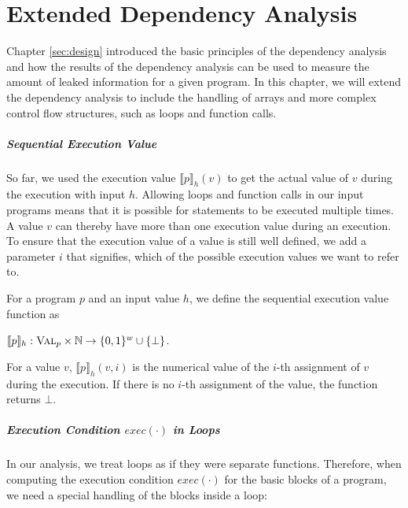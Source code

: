 \chapter{Extended Dependency Analysis}\label{ch:loops}

Chapter \ref{sec:design} introduced the basic principles of the dependency analysis and how the results of the dependency analysis can be used to measure the amount of leaked information for a given program. In this chapter, we will extend the dependency analysis to include the handling of arrays and more complex control flow structures, such as loops and function calls.

\paragraph{Sequential Execution Value}
So far, we used the execution value $\llbracket p \rrbracket_h (v)$ to get the actual value of $v$ during the execution with input $h$. Allowing loops and function calls in our input programs means that it is possible for statements to be executed multiple times. A value $v$ can thereby have more than one execution value during an execution.
To ensure that the execution value of a value is still well defined, we add a parameter $i$ that signifies, which of the possible execution values we want to refer to.

\begin{definition}
    For a program $p$ and an input value $h$, we define the sequential execution value function as
    \begin{center}
        $\llbracket p \rrbracket_h: \textsc{Val}_p \times \mathbb{N} \to \{0, 1\} ^w \cup \{\bot\}$.
    \end{center}
    For a value $v$, $\llbracket p \rrbracket_h(v, i)$ is the numerical value of the $i$-th assignment of $v$ during the execution. If there is no $i$-th assignment of the value, the function returns $\bot$.
\end{definition}

\paragraph{Execution Condition $exec(\cdot)$ in Loops}
In our analysis, we treat loops as if they were separate functions. Therefore, when computing the execution condition $exec(\cdot)$ for the basic blocks of a program, we need a special handling of the blocks inside a loop:

